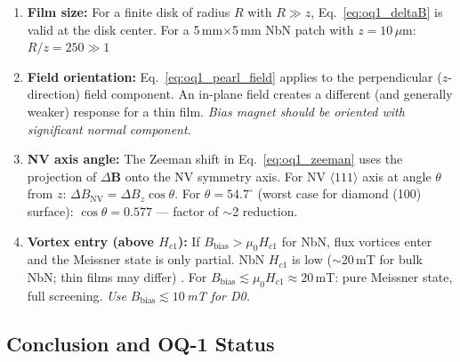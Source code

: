 \begin{enumerate}
  \item \textbf{Film size:} For a finite disk of radius $R$ with $R \gg z$,
    Eq.~\eqref{eq:oq1_deltaB} is valid at the disk center.
    For a 5\,mm$\times$5\,mm NbN patch with $z = 10\,\mu$m: $R/z = 250 \gg 1$ \checkmark

  \item \textbf{Field orientation:} Eq.~\eqref{eq:oq1_pearl_field} applies to the
    perpendicular ($z$-direction) field component. An in-plane field creates
    a different (and generally weaker) response for a thin film. \emph{Bias magnet
    should be oriented with significant normal component.}

  \item \textbf{NV axis angle:} The Zeeman shift in Eq.~\eqref{eq:oq1_zeeman} uses
    the projection of $\Delta\mathbf{B}$ onto the NV symmetry axis.
    For NV $\langle 111 \rangle$ axis at angle $\theta$ from $z$:
    $\Delta B_\text{NV} = \Delta B_z \cos\theta$. For $\theta = 54.7^\circ$ (worst
    case for diamond (100) surface): $\cos\theta = 0.577$ --- factor of $\sim$2 reduction.

  \item \textbf{Vortex entry (above $H_{c1}$):} If $B_\text{bias} > \mu_0 H_{c1}$ for NbN,
    flux vortices enter and the Meissner state is only partial. NbN $H_{c1}$ is low
    ($\sim$20\,mT for bulk NbN; thin films may differ) \cite{Ito2019}.
    For $B_\text{bias} \lesssim \mu_0 H_{c1} \approx 20$\,mT: pure Meissner state,
    full screening. \emph{Use $B_\text{bias} \lesssim 10$\,mT for D0.}
\end{enumerate}

\subsection{Conclusion and OQ-1 Status}
\label{sec:oq1_conclusion}

